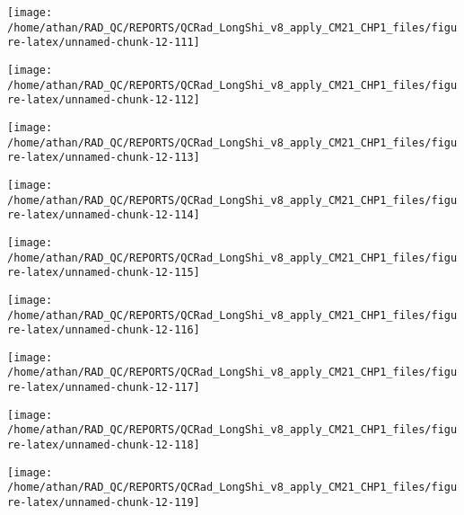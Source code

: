 \documentclass[
  10pt,
  a4paper,oneside]{article}
\begin{document}
\begin{center}\texttt{[image: /home/athan/RAD\_QC/REPORTS/QCRad\_LongShi\_v8\_apply\_CM21\_CHP1\_files/figure-latex/unnamed-chunk-12-111]} \end{center}

\begin{center}\texttt{[image: /home/athan/RAD\_QC/REPORTS/QCRad\_LongShi\_v8\_apply\_CM21\_CHP1\_files/figure-latex/unnamed-chunk-12-112]} \end{center}

\begin{center}\texttt{[image: /home/athan/RAD\_QC/REPORTS/QCRad\_LongShi\_v8\_apply\_CM21\_CHP1\_files/figure-latex/unnamed-chunk-12-113]} \end{center}

\begin{center}\texttt{[image: /home/athan/RAD\_QC/REPORTS/QCRad\_LongShi\_v8\_apply\_CM21\_CHP1\_files/figure-latex/unnamed-chunk-12-114]} \end{center}

\begin{center}\texttt{[image: /home/athan/RAD\_QC/REPORTS/QCRad\_LongShi\_v8\_apply\_CM21\_CHP1\_files/figure-latex/unnamed-chunk-12-115]} \end{center}

\begin{center}\texttt{[image: /home/athan/RAD\_QC/REPORTS/QCRad\_LongShi\_v8\_apply\_CM21\_CHP1\_files/figure-latex/unnamed-chunk-12-116]} \end{center}

\begin{center}\texttt{[image: /home/athan/RAD\_QC/REPORTS/QCRad\_LongShi\_v8\_apply\_CM21\_CHP1\_files/figure-latex/unnamed-chunk-12-117]} \end{center}

\begin{center}\texttt{[image: /home/athan/RAD\_QC/REPORTS/QCRad\_LongShi\_v8\_apply\_CM21\_CHP1\_files/figure-latex/unnamed-chunk-12-118]} \end{center}

\begin{center}\texttt{[image: /home/athan/RAD\_QC/REPORTS/QCRad\_LongShi\_v8\_apply\_CM21\_CHP1\_files/figure-latex/unnamed-chunk-12-119]} \end{center}
\end{document}
